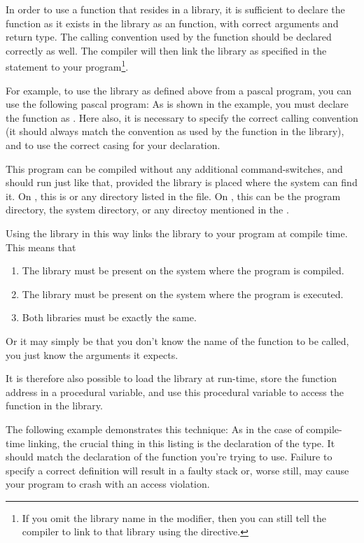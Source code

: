 In order to use a function that resides in a library, it is sufficient to
declare the function as it exists in the library as an 
function, with correct arguments and return type. The calling convention
used by the function should be declared correctly as well. The compiler
will then link the library as specified in the  statement
to your program\footnote{If you omit the library name in the 
modifier, then you can still tell the compiler to link to that library using
the  directive.}.

For example, to use the library as defined above from a pascal program, you can use
the following pascal program:
As is shown in the example, you must declare the function as .
Here also, it is necessary to specify the correct calling convention (it
should always match the convention as used by the function in the library),
and to use the correct casing for your declaration.



This program can be compiled without any additional command-switches,
and should run just like that, provided the library is placed where
the system can find it. On \linux, this is  or any
directory listed in the  file. On \windows, this
can be the program directory, the \windows system directory, or any directoy
mentioned in the .

Using the library in this way links the library to your program at compile
time. This means that
\begin{enumerate}
\item The library must be present on the system where the program is
compiled.
\item The library must be present on the system where the program is
executed.
\item Both libraries must be exactly the same.
\end{enumerate}
Or it may simply be that you don't know the name of the function to
be called, you just know the arguments it expects.

It is therefore also possible to load the library at run-time, store
the function address in a procedural variable, and use this procedural
variable to access the function in the library.

The following example demonstrates this technique:
As in the case of compile-time linking, the crucial thing in this
listing is the declaration of the  type.
It should match the declaration of the function you're trying to use.
Failure to specify a correct definition will result in a faulty stack or,
worse still, may cause your program to crash with an access violation.

